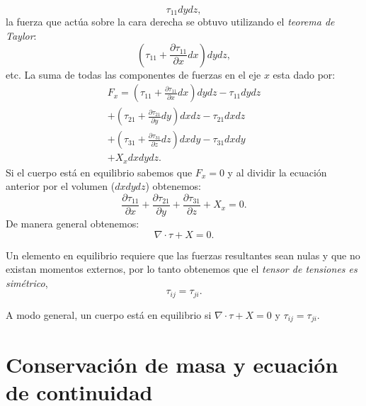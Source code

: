 \documentclass[a4paper,10pt, oneside]{book}
\begin{document}
\begin{equation}
	\tau_{11} dy dz, \nonumber
\end{equation} 
la fuerza que actúa sobre la cara derecha se obtuvo utilizando el \textit{teorema de Taylor}:
\begin{equation}
	\left( \tau_{11} + \frac{\partial \tau_{11}}{\partial x} dx \right) dy dz, \nonumber
\end{equation} 
etc. La suma de todas las componentes de fuerzas en el eje $x$ esta dado por:
\begin{eqnarray}
	F_x = \left( \tau_{11} + \frac{\partial \tau_{11}}{\partial x} dx \right) dy dz - \tau_{11} dy dz \nonumber \\
		+ \left( \tau_{21} + \frac{\partial \tau_{21}}{\partial y} dy \right) dx dz - \tau_{21} dx dz \nonumber \\
		+ \left( \tau_{31} + \frac{\partial \tau_{31}}{\partial z} dz \right) dx dy - \tau_{31} dx dy \nonumber \\
		+ X_x dx dy dz. \nonumber
\end{eqnarray}
Si el cuerpo está en equilibrio sabemos que $F_x = 0$ y al dividir la ecuación anterior por el volumen ($dxdydz$) obtenemos:
\begin{equation}
	\frac{\partial \tau_{11}}{\partial x} + \frac{\partial \tau_{21}}{\partial y} + \frac{\partial \tau_{31}}{\partial z} + X_x = 0. \nonumber
\end{equation}
De manera general obtenemos:
\begin{equation}
	\nabla \cdot \tau + X = 0. \nonumber
\end{equation}

Un elemento en equilibrio requiere que las fuerzas resultantes sean nulas y que no existan momentos externos, por lo tanto obtenemos que el \textit{tensor de tensiones es simétrico},
\begin{equation}
	\tau_{ij} = \tau_{ji}. \nonumber
\end{equation}

A modo general, un cuerpo está en equilibrio si $\nabla \cdot \tau + X = 0$ y $\tau_{ij} = \tau_{ji}$.

\section{Conservación de masa y ecuación de continuidad}
\end{document}
